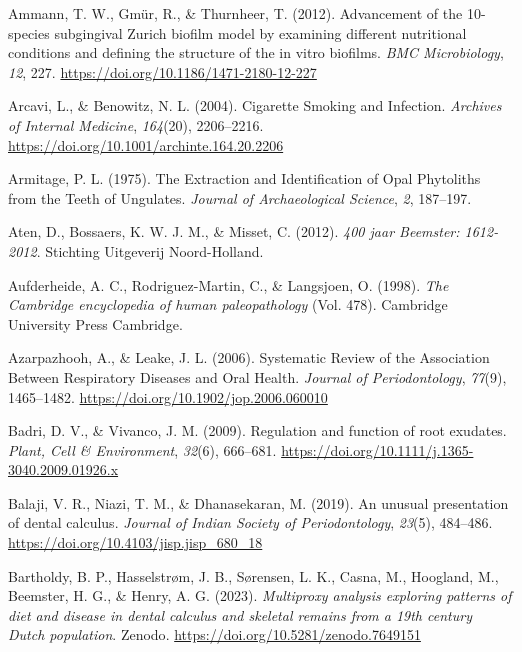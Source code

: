 \documentclass[
  letterpaper,
]{book}
\newlength{\cslhangindent}
\newlength{\cslentryspacingunit} %
\newenvironment{CSLReferences}[2] %
 {%
  \setlength{\parindent}{0pt}
  \ifodd #1
  \let\oldpar\par
  \def\par{\hangindent=\cslhangindent\oldpar}
  \fi
  \setlength{\parskip}{#2\cslentryspacingunit}
 }%
 {}
\begin{document}
\begin{CSLReferences}{1}{0}
\leavevmode{}%
Ammann, T. W., Gmür, R., \& Thurnheer, T. (2012). Advancement of the
10-species subgingival {Zurich} biofilm model by examining different
nutritional conditions and defining the structure of the in vitro
biofilms. \emph{BMC Microbiology}, \emph{12}, 227.
\url{https://doi.org/10.1186/1471-2180-12-227}

\leavevmode{}%
Arcavi, L., \& Benowitz, N. L. (2004). Cigarette {Smoking} and
{Infection}. \emph{Archives of Internal Medicine}, \emph{164}(20),
2206--2216. \url{https://doi.org/10.1001/archinte.164.20.2206}

\leavevmode{}%
Armitage, P. L. (1975). The {Extraction} and {Identification} of {Opal
Phytoliths} from the {Teeth} of {Ungulates}. \emph{Journal of
Archaeological Science}, \emph{2}, 187--197.

\leavevmode{}%
Aten, D., Bossaers, K. W. J. M., \& Misset, C. (2012). \emph{400 jaar
Beemster: 1612-2012}. {Stichting Uitgeverij Noord-Holland}.

\leavevmode{}%
Aufderheide, A. C., Rodriguez-Martin, C., \& Langsjoen, O. (1998).
\emph{The {Cambridge} encyclopedia of human paleopathology} (Vol. 478).
{Cambridge University Press Cambridge}.

\leavevmode{}%
Azarpazhooh, A., \& Leake, J. L. (2006). Systematic {Review} of the
{Association Between Respiratory Diseases} and {Oral Health}.
\emph{Journal of Periodontology}, \emph{77}(9), 1465--1482.
\url{https://doi.org/10.1902/jop.2006.060010}

\leavevmode{}%
Badri, D. V., \& Vivanco, J. M. (2009). Regulation and function of root
exudates. \emph{Plant, Cell \& Environment}, \emph{32}(6), 666--681.
\url{https://doi.org/10.1111/j.1365-3040.2009.01926.x}

\leavevmode{}%
Balaji, V. R., Niazi, T. M., \& Dhanasekaran, M. (2019). An unusual
presentation of dental calculus. \emph{Journal of Indian Society of
Periodontology}, \emph{23}(5), 484--486.
\url{https://doi.org/10.4103/jisp.jisp_680_18}

\leavevmode{}%
Bartholdy, B. P., Hasselstrøm, J. B., Sørensen, L. K., Casna, M.,
Hoogland, M., Beemster, H. G., \& Henry, A. G. (2023). \emph{Multiproxy
analysis exploring patterns of diet and disease in dental calculus and
skeletal remains from a 19th century {Dutch} population}. {Zenodo}.
\url{https://doi.org/10.5281/zenodo.7649151}


\end{CSLReferences}
\end{document}
